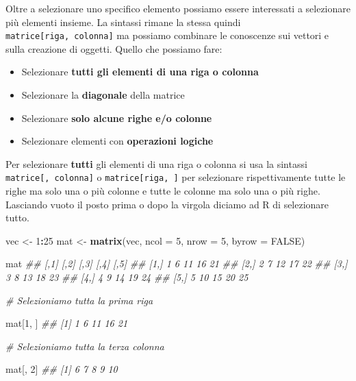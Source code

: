 \documentclass[
]{book}
\newenvironment{Shaded}{\begin{snugshade}}{\end{snugshade}}
\newcommand{\CommentTok}[1]{\textcolor[rgb]{0.56,0.35,0.01}{\textit{#1}}}
\newcommand{\DataTypeTok}[1]{\textcolor[rgb]{0.13,0.29,0.53}{#1}}
\newcommand{\DecValTok}[1]{\textcolor[rgb]{0.00,0.00,0.81}{#1}}
\newcommand{\KeywordTok}[1]{\textcolor[rgb]{0.13,0.29,0.53}{\textbf{#1}}}
\newcommand{\NormalTok}[1]{#1}
\newcommand{\OperatorTok}[1]{\textcolor[rgb]{0.81,0.36,0.00}{\textbf{#1}}}
\newcommand{\OtherTok}[1]{\textcolor[rgb]{0.56,0.35,0.01}{#1}}
\newcommand{\StringTok}[1]{\textcolor[rgb]{0.31,0.60,0.02}{#1}}
\providecommand{\tightlist}{%
  \setlength{\itemsep}{0pt}\setlength{\parskip}{0pt}}
\begin{document}
Oltre a selezionare uno specifico elemento possiamo essere interessati a selezionare più elementi insieme. La sintassi rimane la stessa quindi \texttt{matrice{[}riga,\ colonna{]}} ma possiamo combinare le conoscenze sui vettori e sulla creazione di oggetti. Quello che possiamo fare:

\begin{itemize}
\tightlist
\item
  Selezionare \textbf{tutti gli elementi di una riga o colonna}
\item
  Selezionare la \textbf{diagonale} della matrice
\item
  Selezionare \textbf{solo alcune righe e/o colonne}
\item
  Selezionare elementi con \textbf{operazioni logiche}
\end{itemize}

Per selezionare \textbf{tutti} gli elementi di una riga o colonna si usa la sintassi \texttt{matrice{[},\ colonna{]}} o \texttt{matrice{[}riga,\ {]}} per selezionare rispettivamente tutte le righe ma solo una o più colonne e tutte le colonne ma solo una o più righe. Lasciando vuoto il posto prima o dopo la virgola diciamo ad R di selezionare tutto.

\begin{Shaded}
\begin{Highlighting}[]
\NormalTok{vec <-}\StringTok{ }\DecValTok{1}\OperatorTok{:}\DecValTok{25}
\NormalTok{mat <-}\StringTok{ }\KeywordTok{matrix}\NormalTok{(vec, }\DataTypeTok{ncol =} \DecValTok{5}\NormalTok{, }\DataTypeTok{nrow =} \DecValTok{5}\NormalTok{, }\DataTypeTok{byrow =} \OtherTok{FALSE}\NormalTok{)}

\NormalTok{mat}
\CommentTok{##      [,1] [,2] [,3] [,4] [,5]}
\CommentTok{## [1,]    1    6   11   16   21}
\CommentTok{## [2,]    2    7   12   17   22}
\CommentTok{## [3,]    3    8   13   18   23}
\CommentTok{## [4,]    4    9   14   19   24}
\CommentTok{## [5,]    5   10   15   20   25}

\CommentTok{# Selezioniamo tutta la prima riga}

\NormalTok{mat[}\DecValTok{1}\NormalTok{, ]}
\CommentTok{## [1]  1  6 11 16 21}

\CommentTok{# Selezioniamo tutta la terza colonna}

\NormalTok{mat[, }\DecValTok{2}\NormalTok{]}
\CommentTok{## [1]  6  7  8  9 10}
\end{Highlighting}
\end{Shaded}
\end{document}
